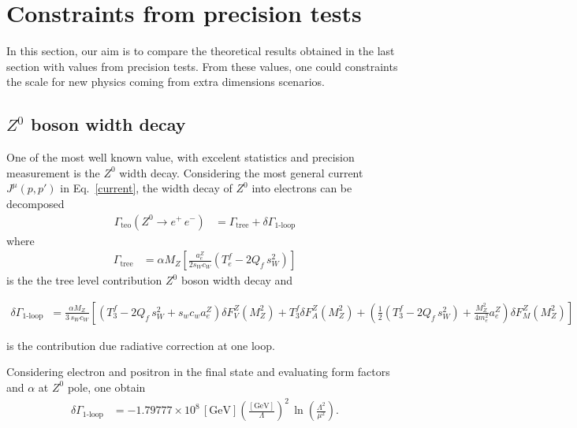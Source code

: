 \section{Constraints from precision tests}
In this section, our aim is to compare the theoretical results obtained in the last section with values from precision tests. From these values, one could constraints the scale for new physics coming from extra dimensions scenarios.

\subsection{$Z^0$ boson width decay}

One of the most well known value, with excelent statistics and precision measurement is the $Z^0$ width decay. Considering the most general current $J^\mu(p,p')$ in Eq.~\eqref{current}, the width decay of $Z^0$ into electrons can be decomposed
\begin{align}
\Gamma_{\text{teo}}\left(Z^0\rightarrow e^+\,e^-\right) &= \Gamma_{\text{tree}} + \delta\Gamma_{1\text{-loop}}
\end{align}
where
\begin{align}
 \Gamma_{\text{tree}} &= \alpha M_Z\left[\frac{a_e^Z}{2s_Wc_W}(T_e^f - 2Q_f\,s_W^2)\right] 
\end{align}
is the the tree level contribution $Z^0$ boson width decay and
\begin{widetext}
\begin{align}
\nonumber
  \delta\Gamma_{1\text{-loop}} &= \frac{\alpha M_Z}{3\,s_Wc_W}\left[(T_3^f - 2Q_f\,s_W^2+s_wc_wa_e^Z)\delta F_V^Z(M_Z^2) + T_3^f\delta F_A^Z(M_Z^2) + \left(\frac{1}{2}(T_3^f - 2Q_f\,s_W^2) +\frac{M_Z^2}{4m_e^2}a_e^Z\right)\delta F_M^Z(M_Z^2)\right]
\end{align}
\end{widetext}
is the contribution due radiative correction at one loop. 

Considering electron and positron in the final state and evaluating form factors and $\alpha$ at $Z^0$ pole, one obtain 
\begin{align}
\label{deltagammateo}
 \delta\Gamma_{1\text{-loop}} &= -1.79777\times10^8\,[\text{GeV}]\left(\frac{[\text{GeV}]}{\Lambda}\right)^2\,\ln\left(\frac{\Lambda^2}{\mu^2}\right).
\end{align}

